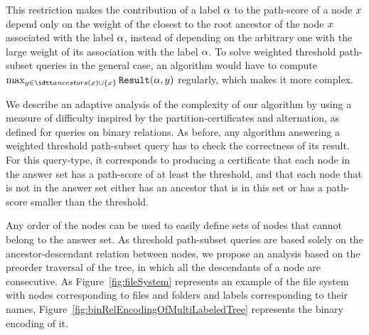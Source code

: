 This restriction makes the contribution of a label $\alpha$ to the
path-score of a node $x$ depend only on the weight of the closest
to the root ancestor of the node $x$ associated with the label
$\alpha$, instead of depending on the arbitrary one with the large
weight of its association with the label $\alpha$.
%
To solve weighted threshold path-subset queries in the general case,
an algorithm would have to compute
$\max_{\nodey\in\ancestors(x)\cup\{\nodex\}}{\R(\labelx,\nodey)}$
regularly, which makes it more complex.


\medskip 

We describe an adaptive analysis of the complexity of our algorithm by
using a measure of difficulty inspired by the partition-certificates
and alternation, as defined for queries on binary relations.
%
As before, any algorithm answering a weighted threshold path-subset
query has to check the correctness of its result.
%
For this query-type, it corresponds to producing a certificate that each
node in the answer set has a path-score of at least the threshold, and that
each node that is not in the answer set either has an ancestor that is in this set or has a
path-score smaller than the threshold.

Any order of the nodes can be used to easily define sets of
nodes that cannot belong to the answer set.
%
As threshold path-subset queries are based solely on the
ancestor-descendant relation between nodes, we propose an analysis
based on the preorder traversal of the tree, in which all the
descendants of a node are consecutive.
%
As Figure~\ref{fig:fileSystem} represents an example of the file system with nodes corresponding to files and folders and labels corresponding to their names, Figure~\ref{fig:binRelEncodingOfMultiLabeledTree} represents the binary encoding of it.



